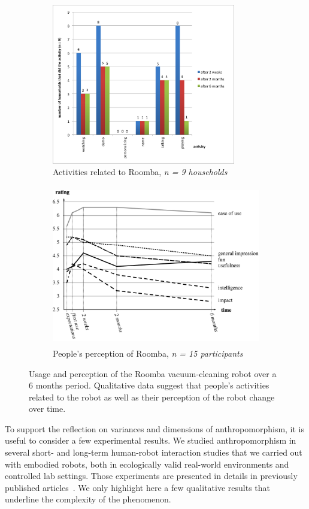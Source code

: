 \documentclass{frontiersSCNS} %
\begin{document}
\begin{figure}[b]
        \centering
        \begin{subfigure}[t]{0.48\columnwidth}
                \includegraphics[height=7cm]{roomba-activities}
                \caption{Activities related to Roomba, \textit{n = 9 households}}
                \label{fig:roomba-activities}
        \end{subfigure}%
        \hspace{0.5cm} 
        \begin{subfigure}[t]{0.48\columnwidth}
                \includegraphics[height=7cm]{roomba-ratings}
                \caption{People's perception of Roomba, \textit{n = 15
                participants}}
                \label{fig:roomba-perception}
        \end{subfigure}
    \caption{Usage and perception of the Roomba vacuum-cleaning robot over a 6
    months period. Qualitative data suggest that people's activities related to
    the robot as well as their perception of the robot change over time.}
    \label{fig:roomba}
\end{figure}

To support the reflection on variances and dimensions of anthropomorphism, it is 
useful to consider a few experimental
results. We studied anthropomorphism in several short- and long-term
human-robot interaction studies that we carried out with embodied robots, both
in ecologically valid real-world environments and controlled lab settings. Those
experiments are presented in details in previously published
articles~\citep{fink_anthropomorphic_2012, fink_living_2013, fink2014which,
lemaignan2014dynamics}. We only highlight here a few qualitative results that
underline the complexity of the phenomenon.
\end{document}
